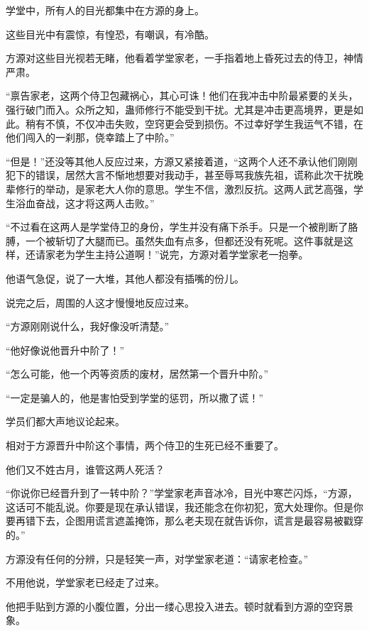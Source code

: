 
\begin{this_body}

学堂中，所有人的目光都集中在方源的身上。

这些目光中有震惊，有惶恐，有嘲讽，有冷酷。

方源对这些目光视若无睹，他看着学堂家老，一手指着地上昏死过去的侍卫，神情严肃。

“禀告家老，这两个侍卫包藏祸心，其心可诛！他们在我冲击中阶最紧要的关头，强行破门而入。众所之知，蛊师修行不能受到干扰。尤其是冲击更高境界，更是如此。稍有不慎，不仅冲击失败，空窍更会受到损伤。不过幸好学生我运气不错，在他们闯入的一刹那，侥幸踏上了中阶。”

“但是！”还没等其他人反应过来，方源又紧接着道，“这两个人还不承认他们刚刚犯下的错误，居然大言不惭地想要对我动手，甚至辱骂我族先祖，谎称此次干扰晚辈修行的举动，是家老大人你的意思。学生不信，激烈反抗。这两人武艺高强，学生浴血奋战，这才将这两人击败。”

“不过看在这两人是学堂侍卫的身份，学生并没有痛下杀手。只是一个被削断了胳膊，一个被斩切了大腿而已。虽然失血有点多，但都还没有死呢。这件事就是这样，还请家老为学生主持公道啊！”说完，方源对着学堂家老一抱拳。

他语气急促，说了一大堆，其他人都没有插嘴的份儿。

说完之后，周围的人这才慢慢地反应过来。

“方源刚刚说什么，我好像没听清楚。”

“他好像说他晋升中阶了！”

“怎么可能，他一个丙等资质的废材，居然第一个晋升中阶。”

“一定是骗人的，他是害怕受到学堂的惩罚，所以撒了谎！”

学员们都大声地议论起来。

相对于方源晋升中阶这个事情，两个侍卫的生死已经不重要了。

他们又不姓古月，谁管这两人死活？

“你说你已经晋升到了一转中阶？”学堂家老声音冰冷，目光中寒芒闪烁，“方源，这话可不能乱说。你要是现在承认错误，我还能念在你初犯，宽大处理你。但是你要再错下去，企图用谎言遮盖掩饰，那么老夫现在就告诉你，谎言是最容易被戳穿的。”

方源没有任何的分辨，只是轻笑一声，对学堂家老道：“请家老检查。”

不用他说，学堂家老已经走了过来。

他把手贴到方源的小腹位置，分出一缕心思投入进去。顿时就看到方源的空窍景象。


\end{this_body}
